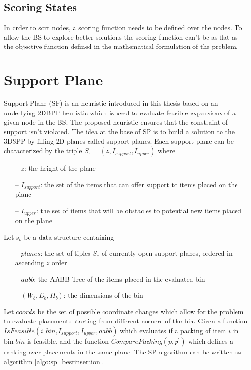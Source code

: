 

\subsection{Scoring States}\label{chapter:heuristics:beamsearch:scoring}
In order to sort nodes, a scoring function needs to be defined over the nodes. 
To allow the BS to explore better solutions the scoring function can't be as flat as the objective function defined in the mathematical formulation of the problem. %

\section{Support Plane}\label{chapter:heuristics:supportplane}
Support Plane (SP) is an heuristic introduced in this thesis based on an underlying 2DBPP heuristic which is used to evaluate feasible expansions of a given node in the BS.
The proposed heuristic ensures that the constraint of support isn't violated.
The idea at the base of SP is to build a solution to the 3DSPP by filling 2D planes called support planes.
Each support plane can be characterized by the triple $S_z = (z, I_{support}, I_{upper})$ where
\begin{itemize}
    \item[--] $z$: the height of the plane 
    \item[--] $I_{support}$: the set of the items that can offer support to items placed on the plane
    \item[--] $I_{upper}$: the set of items that will be obstacles to potential new items placed on the plane 
\end{itemize}%
Let $s_b$ be a data structure containing
\begin{itemize}
    \item[--] $planes$: the set of tiples $S_z$ of currently open support planes, ordered in ascending $z$ order %
    \item[--] $aabb$: the AABB Tree of the items placed in the evaluated bin
    \item[--] $(W_{b}, D_{b}, H_{b})$: the dimensions of the bin
\end{itemize}
Let $coords$ be the set of possible coordinate changes which allow for the problem to evaluate placements starting from different corners of the bin. %
Given a function $IsFeasible(i, bin, I_{support}, I_{upper}, aabb)$ which evaluates if a packing of item $i$ in bin $bin$ is feasible,
and the function $ComparePacking(p, p^\prime)$ which defines a ranking over placements in the same plane.
The SP algorithm can be written as algorithm \ref{algo:sp_bestinsertion}.

